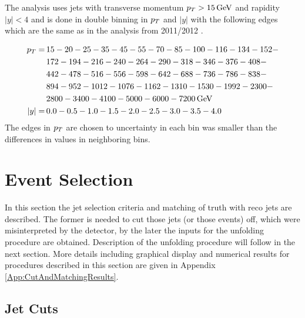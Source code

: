 The analysis uses jets with transverse momentum $p_{T} > 15\,\text{GeV}$ and rapidity $|y| <
4$ and is done in double binning in $p_{T}$ and $|y|$ with the following edges
which are the same as in the analysis from 2011/2012 \cite{Analysis2012}.

\begin{align}
  p_{T} = \, &15-20-25-35-45-55-70-85-100-116-134-152- \nonumber \\
        &172-194-216-240-264-290-318-346-376-408- \nonumber \\
        &442-478-516-556-598-642-688-736-786-838- \nonumber \\
        &894-952-1012-1076-1162-1310-1530-1992-2300- \nonumber \\
        &2800-3400-4100-5000-6000-7200 \,\text{GeV} \nonumber \\
  |y| = \, &0.0-0.5-1.0-1.5-2.0-2.5-3.0-3.5-4.0
  \label{eq:Binning}
\end{align}
The edges in $p_{T}$ are chosen to uncertainty in each bin was smaller than the
differences in values in neighboring bins.

\section{Event Selection}

In this section the jet selection criteria and matching of truth with reco
jets are described. The former is needed to cut those jets (or those events)
off, which were misinterpreted by the detector, by the later the inputs for the
unfolding procedure are obtained. Description of the unfolding procedure will
follow in the next section. More details including graphical display and
numerical results for procedures described in this section are given in Appendix
\ref{App:CutAndMatchingResults}.

\subsection{Jet Cuts}
\label{SubSec:JetCuts}

